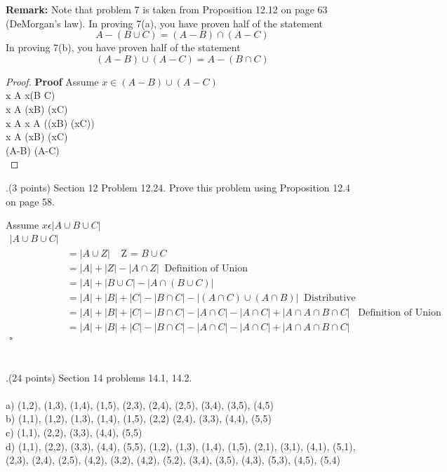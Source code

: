 \documentclass[12pt]{article}
\begin{document}
\noindent \textbf{Remark:} Note that problem 7 is taken from Proposition 12.12 on page 63 (DeMorgan's law).  In proving 7(a), you have proven half of the statement 
\[
A - (B \cup C) =  (A -B) \cap (A - C)
\]
In proving 7(b), you have proven half of the statement 
\[
(A - B) \cup (A - C) = A - (B \cap C)
\]

\begin {proof}
\textbf{Proof } Assume $x \in (A-B) \cup (A-C)$\\
\Rightarrow x \in A \wedge x\notin (B \cap C) \\
\Rightarrow x \in A \wedge (x\notin B) \cup (x\notin C) \\
\Rightarrow x \in A \wedge x \in A \wedge ((x\notin B) \cup (x\notin C)) \\
\Rightarrow x \in A \wedge (x\notin B) \cup (x\notin C) \\
\Rightarrow (A-B) \cup (A-C)\\

\end{proof}


.(3 points)  Section 12 Problem 12.24.  Prove this problem using Proposition 12.4 on page 58.  
\vspace{.15in}

\item Assume $x \epsilon |A \cup B \cup C|$ \\ 
\[
\begin{aligned} 
 |A \cup B \cup C|\\
&= |A \cup Z|  \;\;\;\;  \mbox{Z = $B \cup C$} \\   
&= |A| + |Z| - |A \cap Z|  \;\; \mbox{Definition of Union}\\
&= |A| + |B \cup C| - |A \cap (B \cup C)| \;\; \mbox{}\\
&= |A| + |B| + |C| - |B \cap C| - |(A \cap C) \cup (A \cap B)| \;\; \mbox{Distributive} \\
&= |A| + |B| + |C| - |B \cap C| - |A \cap C| - |A \cap C| + |A \cap A \cap B \cap C| \;\;\; \mbox{Definition of Union} \\
&= |A| + |B| + |C| - |B \cap C| - |A \cap C| - |A \cap C| + |A \cap A \cap B \cap C| \\ 
\square \\
\end{aligned}
\]



\\
.(24 points)  Section 14 problems 14.1, 14.2. \\
  \\
\indent a) (1,2), (1,3), (1,4), (1,5), (2,3), (2,4), (2,5), (3,4), (3,5), (4,5) \\
\indent b) (1,1), (1,2), (1,3), (1,4), (1,5), (2,2) (2,4), (3,3), (4,4), (5,5) \\
\indent c) (1,1), (2,2), (3,3), (4,4), (5,5) \\
\indent d) (1,1), (2,2), (3,3), (4,4), (5,5), (1,2), (1,3), (1,4), (1,5), (2,1), (3,1), (4,1), \indent (5,1), (2,3), (2,4), (2,5), (4,2), (3,2), (4,2), (5,2), (3,4), (3,5), (4,3), (5,3), (4,5), (5,4)\\
\end{document}
